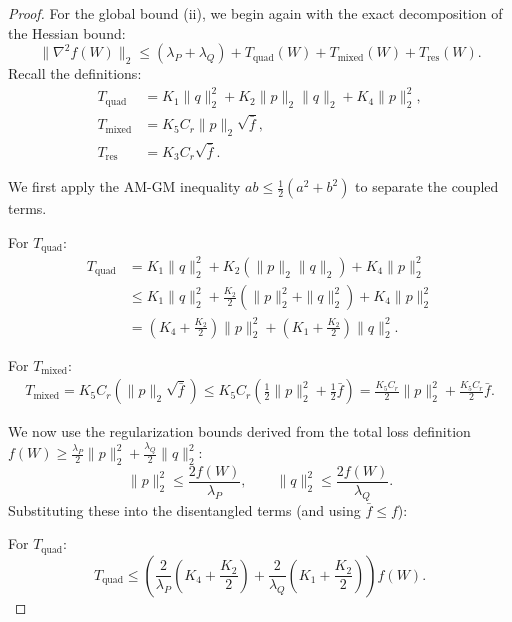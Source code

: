 \documentclass[a4paper,11pt]{article}
\newcommand{\1}{\mathbbm{1}}
\theoremstyle{plain}
\begin{document}
\begin{proof}
For the global bound (ii), we begin again with the exact decomposition of the Hessian bound:
\begin{equation*}
\label{eq:phase2_start}
    \|\nabla^2 f(W)\|_2 \le (\lambda_P + \lambda_Q) + T_{\text{quad}}(W) + T_{\text{mixed}}(W) + T_{\text{res}}(W).
\end{equation*}
Recall the definitions:
\begin{align*}
    T_{\text{quad}} &= K_1 \|q\|_2^2 + K_2 \|p\|_2 \|q\|_2 + K_4 \|p\|_2^2, \\
    T_{\text{mixed}} &= K_5 C_r \|p\|_2 \sqrt{\bar{f}}, \\
    T_{\text{res}} &= K_3 C_r \sqrt{\bar{f}}.
\end{align*}


We first apply the AM-GM inequality $ab \le \frac{1}{2}(a^2+b^2)$ to separate the coupled terms.

For $T_{\text{quad}}$:
\begin{align*}
    T_{\text{quad}} &= K_1 \|q\|_2^2 + K_2 (\|p\|_2 \|q\|_2) + K_4 \|p\|_2^2
    \\ & \le K_1 \|q\|_2^2 + \frac{K_2}{2} (\|p\|_2^2 + \|q\|_2^2) + K_4 \|p\|_2^2
    \\ & = \left( K_4 + \frac{K_2}{2} \right) \|p\|_2^2 + \left( K_1 + \frac{K_2}{2} \right) \|q\|_2^2.
\end{align*}

For $T_{\text{mixed}}$:
\begin{align*}
    T_{\text{mixed}} = K_5 C_r (\|p\|_2 \sqrt{\bar{f}})
    \le K_5 C_r \left( \frac{1}{2}\|p\|_2^2 + \frac{1}{2}\bar{f} \right)
    = \frac{K_5 C_r}{2} \|p\|_2^2 + \frac{K_5 C_r}{2} \bar{f}.
\end{align*}

We now use the regularization bounds derived from the total loss definition $f(W) \ge \frac{\lambda_P}{2}\|p\|_2^2 + \frac{\lambda_Q}{2}\|q\|_2^2$:
\begin{equation*}
    \|p\|_2^2 \le \frac{2 f(W)}{\lambda_P}, \qquad \|q\|_2^2 \le \frac{2 f(W)}{\lambda_Q}.
\end{equation*}
Substituting these into the disentangled terms (and using $\bar{f} \le f$):

For $T_{\text{quad}}$:
\begin{equation*}
    T_{\text{quad}} \le \left( \frac{2}{\lambda_P}\left( K_4 + \frac{K_2}{2} \right) + \frac{2}{\lambda_Q}\left( K_1 + \frac{K_2}{2} \right) \right) f(W).
\end{equation*}


\end{proof}
\end{document}
